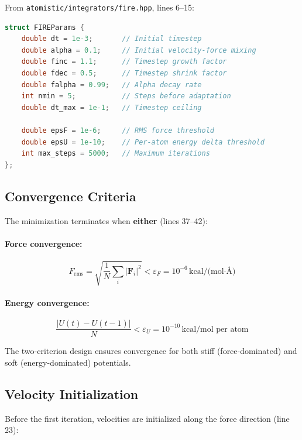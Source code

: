 \documentclass[11pt]{article}
\begin{document}
From \texttt{atomistic/integrators/fire.hpp}, lines 6--15:

\begin{lstlisting}[language=C++]
struct FIREParams {
    double dt = 1e-3;       // Initial timestep
    double alpha = 0.1;     // Initial velocity-force mixing
    double finc = 1.1;      // Timestep growth factor
    double fdec = 0.5;      // Timestep shrink factor
    double falpha = 0.99;   // Alpha decay rate
    int nmin = 5;           // Steps before adaptation
    double dt_max = 1e-1;   // Timestep ceiling
    
    double epsF = 1e-6;     // RMS force threshold
    double epsU = 1e-10;    // Per-atom energy delta threshold
    int max_steps = 5000;   // Maximum iterations
};
\end{lstlisting}

\subsection{Convergence Criteria}

The minimization terminates when \textbf{either} (lines 37--42):

\paragraph{Force convergence:}
\begin{equation}
F_{\text{rms}} = \sqrt{\frac{1}{N}\sum_i |\mathbf{F}_i|^2} < \varepsilon_F = 10^{-6}\,\text{kcal/(mol·\AA)}
\end{equation}

\paragraph{Energy convergence:}
\begin{equation}
\frac{|U(t) - U(t-1)|}{N} < \varepsilon_U = 10^{-10}\,\text{kcal/mol per atom}
\end{equation}

The two-criterion design ensures convergence for both stiff (force-dominated) and soft (energy-dominated) potentials.

\subsection{Velocity Initialization}

Before the first iteration, velocities are initialized along the force direction (line 23):
\end{document}
